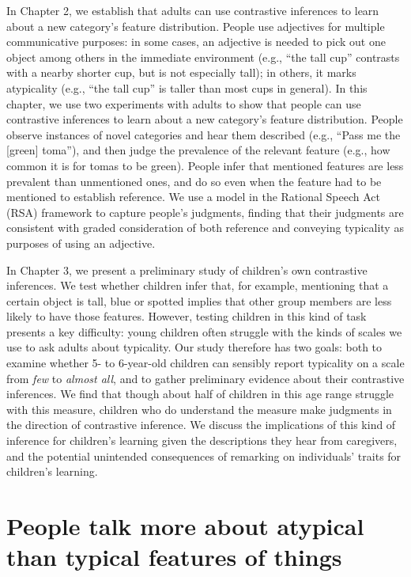 \documentclass{ucetd}
\begin{document}
In Chapter 2, we establish that adults can use contrastive inferences to
learn about a new category's feature distribution. People use adjectives
for multiple communicative purposes: in some cases, an adjective is
needed to pick out one object among others in the immediate environment
(e.g., ``the tall cup'' contrasts with a nearby shorter cup, but is not
especially tall); in others, it marks atypicality (e.g., ``the tall
cup'' is taller than most cups in general). In this chapter, we use two
experiments with adults to show that people can use contrastive
inferences to learn about a new category's feature distribution. People
observe instances of novel categories and hear them described (e.g.,
``Pass me the {[}green{]} toma''), and then judge the prevalence of the
relevant feature (e.g., how common it is for tomas to be green). People
infer that mentioned features are less prevalent than unmentioned ones,
and do so even when the feature had to be mentioned to establish
reference. We use a model in the Rational Speech Act (RSA) framework to
capture people's judgments, finding that their judgments are consistent
with graded consideration of both reference and conveying typicality as
purposes of using an adjective.

In Chapter 3, we present a preliminary study of children's own
contrastive inferences. We test whether children infer that, for
example, mentioning that a certain object is tall, blue or spotted
implies that other group members are less likely to have those features.
However, testing children in this kind of task presents a key
difficulty: young children often struggle with the kinds of scales we
use to ask adults about typicality. Our study therefore has two goals:
both to examine whether 5- to 6-year-old children can sensibly report
typicality on a scale from \emph{few} to \emph{almost all}, and to
gather preliminary evidence about their contrastive inferences. We find
that though about half of children in this age range struggle with this
measure, children who do understand the measure make judgments in the
direction of contrastive inference. We discuss the implications of this
kind of inference for children's learning given the descriptions they
hear from caregivers, and the potential unintended consequences of
remarking on individuals' traits for children's learning.

\hypertarget{people-talk-more-about-atypical-than-typical-features-of-things}{%
\chapter{People talk more about atypical than typical features of
things}\label{people-talk-more-about-atypical-than-typical-features-of-things}}
\end{document}
